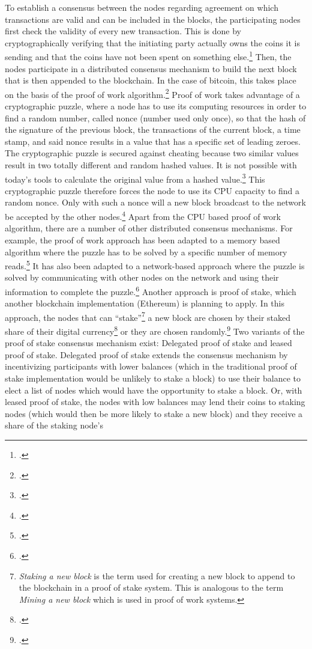 To establish a consensus between the nodes regarding agreement on which transactions are valid and can be included in the blocks, the participating nodes first check the validity of every new transaction. This is done by cryptographically verifying that the initiating party actually owns the coins it is sending and that the coins have not been spent on something else.\footcite[Cf.][p.68]{AntonopolousAndreasM..2017} Then, the nodes participate in a distributed consensus mechanism to build the next block that is then appended to the blockchain. In the case of bitcoin, this takes place on the basis of the proof of work algorithm.\footcites[Cf.][]{Dwork.1993}[cf.][p.3]{Nakamoto.2008} Proof of work takes advantage of a cryptographic puzzle, where a node has to use its computing resources in order to find a random number, called nonce (number used only once), so that the hash of the signature of the previous block, the transactions of the current block, a time stamp, and said nonce results in a value that has a specific set of leading zeroes. The cryptographic puzzle is secured against cheating because two similar values result in two totally different and random hashed values. It is not possible with today's tools to calculate the original value from a hashed value.\footcite[Cf.][p.12]{SwanBlockchainblueprintnew2015} This cryptographic puzzle therefore forces the node to use its CPU capacity to find a random nonce. Only with such a nonce will a new block broadcast to the network be accepted by the other nodes.\footcites[Cf.][p.8]{Nakamoto.2008}[cf.][p.12]{Schutte.2017} Apart from the CPU based proof of work algorithm, there are a number of other distributed consensus mechanisms. For example, the proof of work approach has been adapted to a memory based algorithm where the puzzle has to be solved by a specific number of memory reads.\footcite[Cf.][]{Abadi.2005} It has also been adapted to a network-based approach where the puzzle is solved by communicating with other nodes on the network and using their information to complete the puzzle.\footcite[Cf.][]{Abliz.2009} Another approach is proof of stake, which another blockchain implementation (Ethereum) is planning to apply. In this approach, the nodes that can \enquote{stake}\footnote{\textit{Staking a  new block} is the term used for creating a new block to append to the blockchain in a proof of stake system. This is analogous to the term \textit{Mining a new block} which is used in proof of work systems.} a new block are chosen by their staked share of their digital currency\footcite[Cf.][]{King.2012} or they are chosen randomly.\footcites[Cf.][]{w.A..2016}[cf.][p.200]{AntonopolousAndreasM..2017}[cf.][p.11 et seq]{Schlatt.2016} Two variants of the proof of stake consensus mechanism exist: Delegated proof of stake and leased proof of stake. Delegated proof of stake extends the consensus mechanism by incentivizing participants with lower balances (which in the traditional proof of stake implementation would be unlikely to stake a block) to use their balance to elect a list of nodes which would have the opportunity to stake a block. Or, with leased proof of stake, the nodes with low balances may lend their coins to staking nodes (which would then be more likely to stake a new block) and they receive a share of the staking node's 